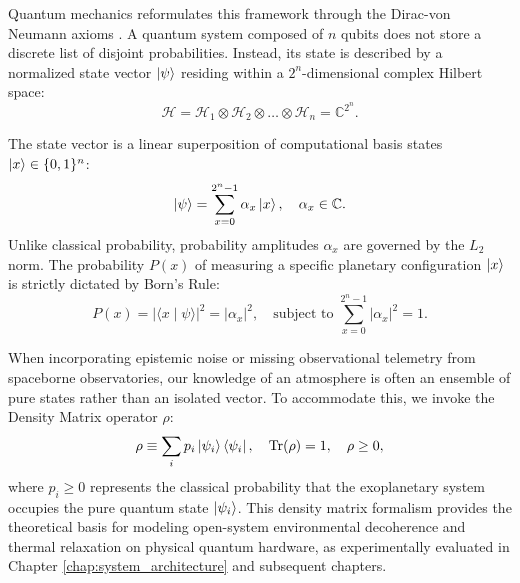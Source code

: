 Quantum mechanics reformulates this framework through the Dirac-von Neumann axioms \cite{nielsen2010}. A quantum system composed of $n$ qubits does not store a discrete list of disjoint probabilities. Instead, its state is described by a normalized state vector $\left|\psi\right\rangle$ residing within a $2^n$-dimensional complex Hilbert space:
\begin{equation}
\mathcal{H} = \mathcal{H}_1 \otimes \mathcal{H}_2 \otimes \dots \otimes \mathcal{H}_n = \mathbb{C}^{2^n}.
\label{eq:hilbert_space_tensor_product}
\end{equation}

The state vector is a linear superposition of computational basis states $\left|x\right\rangle \in \{0, 1\}^n$:
\begin{equation}
\left|\psi\right\rangle = \sum_{x=0}^{2^n-1} \alpha_x \left|x\right\rangle, \quad \alpha_x \in \mathbb{C}.
\label{eq:quantum_superposition_ch3}
\end{equation}
Unlike classical probability, probability amplitudes $\alpha_x$ are governed by the $L_2$ norm. The probability $P(x)$ of measuring a specific planetary configuration $\left|x\right\rangle$ is strictly dictated by Born's Rule:
\begin{equation}
P(x) = |\langle x \mid \psi \rangle|^2 = |\alpha_x|^2, \quad \text{subject to } \sum_{x=0}^{2^n-1} |\alpha_x|^2 = 1.
\label{eq:born_rule_ch3}
\end{equation}

When incorporating epistemic noise or missing observational telemetry from spaceborne observatories, our knowledge of an atmosphere is often an ensemble of pure states rather than an isolated vector. To accommodate this, we invoke the Density Matrix operator $\rho$:
\begin{equation}
\rho \equiv \sum_i p_i \left|\psi_i\right\rangle\left\langle\psi_i\right|, \quad \mathrm{Tr}(\rho) = 1, \quad \rho \ge 0,
\label{eq:density_matrix_def_ch3}
\end{equation}
where $p_i \ge 0$ represents the classical probability that the exoplanetary system occupies the pure quantum state $\left|\psi_i\right\rangle$. This density matrix formalism provides the theoretical basis for modeling open-system environmental decoherence and thermal relaxation on physical quantum hardware, as experimentally evaluated in Chapter \ref{chap:system_architecture} and subsequent chapters.

